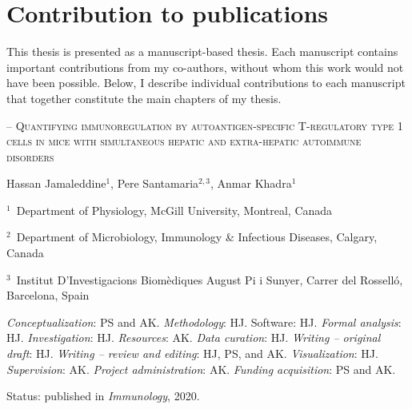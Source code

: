 \chapter*{Contribution to publications}

\setlength{\parindent}{0pt}
\setlength{\parskip}{3pt}

This thesis is presented as a manuscript-based thesis. Each manuscript contains important contributions from my co-authors, without whom this work would not have been possible. Below, I describe individual contributions to each manuscript that together constitute the main chapters of my thesis.

\vspace{24pt}

\textsc{} -- \textsc{Quantifying immunoregulation by autoantigen-specific T-regulatory type 1 cells in mice with simultaneous hepatic and extra-hepatic autoimmune disorders}

\hspace*{0.25in}%
\begin{minipage}{6in}
    \setlength{\parskip}{1pt}
    \vspace{6pt}
    Hassan Jamaleddine$^{1 }$, Pere Santamaria$^{2,3}$, Anmar Khadra$^{1}$

    \vspace{6pt}
    
    {\small $^1$~Department of Physiology, McGill University, Montreal, Canada \par $^2$~Department of Microbiology, Immunology \& Infectious Diseases, Calgary, Canada \par $^3$~Institut D’Investigacions Biom\`{e}diques August Pi i Sunyer, Carrer del Rossell\'{o}, Barcelona, Spain}

    \vspace{6pt}
    
    \textit{Conceptualization}: PS and AK. \textit{Methodology}: HJ. Software: HJ. \textit{Formal analysis}: HJ. \textit{Investigation}: HJ. \textit{Resources}: AK. \textit{Data curation}: HJ. \textit{Writing -- original draft}: HJ. \textit{Writing – review and editing}: HJ, PS, and AK. \textit{Visualization}: HJ. \textit{Supervision}: AK. \textit{Project administration}: AK. \textit{Funding acquisition}: PS and AK.

    \vspace{6pt}
    
    Status: published in \textit{Immunology}, 2020.
\end{minipage}

